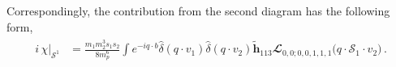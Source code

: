 Correspondingly, the contribution from the second diagram has the following form,
\begin{align}
    \begin{split}
i\,\chi\Big|_{\mathcal{S}^1}&=\frac{ m_1 m_2^3 s_1 s_2}{8 m_p^6}\int e^{-iq\cdot b} \hat\delta(q\cdot v_1)\hat\delta(q\cdot v_2)\boldsymbol{\tilde h}_{113} \mathbfcal{L}_{0,0;0,0,1,1,1}\big(q\cdot\mathcal{S}_1\cdot v_2\big)\,.
       \end{split}
\end{align}
